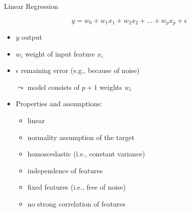 \documentclass[11pt,compress,t,notes=noshow, xcolor=table]{beamer}
\begin{document}
% 
% 



\begin{vbframe}{Linear Regression}

    $$y = w_0 + w_1 x_1 + w_2 x_2 + \ldots + w_p x_p + \epsilon $$

    \begin{itemize}
        \item $y$ output
        \item $w_i$ weight of input feature $x_i$
        \item $\epsilon$ remaining error (e.g., because of noise)
        \item[$\leadsto$] model consists of $p+1$ weights $w_i$
        \item Properties and assumptions:
        \begin{itemize}
            \item linear
            \item normality assumption of the target
            \item homoscedastic (i.e., constant variance)
            \item independence of features
            \item fixed features (i.e., free of noise)
            \item no strong correlation of features
        \end{itemize} 
    \end{itemize}

\end{vbframe}
\end{document}
